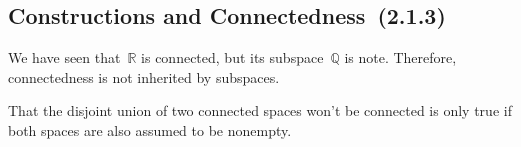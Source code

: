 \subsection{Constructions and Connectedness~(2.1.3)}

We have seen that~$ℝ$ is connected, but its subspace~$ℚ$ is note.
Therefore, connectedness is not inherited by subspaces.

That the disjoint union of two connected spaces won’t be connected is only true if both spaces are also assumed to be nonempty.
